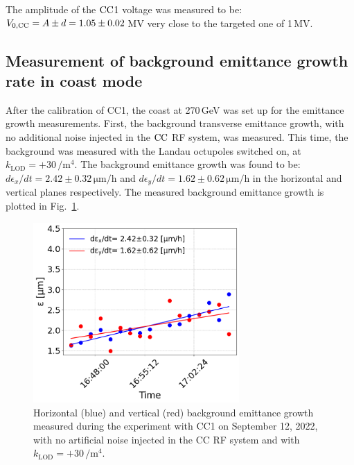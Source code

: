 The amplitude of the ${\mathrm{CC}}$1 voltage was measured to be: ${V_\mathrm{0, CC}}=A \pm d = 1.05 \pm 0.02$\,MV very close to the targeted one of 1\,MV.

\subsection{Measurement of background emittance growth rate in coast mode}
After the calibration of CC1, the coast at 270\,GeV was set up for the emittance growth measurements. First, the background transverse emittance growth, with no additional noise injected in the ${\mathrm{CC}}$ RF system, was measured. This time, the background was measured with the Landau octupoles switched on, at $k_\mathrm{LOD}=+30$\,$\mathrm{/m^4}$. The background emittance growth was found to be: $d\epsilon_x/dt=2.42 \pm 0.32$\,$\mathrm{\mu m/h}$ and $d\epsilon_y/dt=1.62 \pm 0.62$\,$\mathrm{\mu m/h}$ in the horizontal and vertical planes respectively. The measured background emittance growth is plotted in Fig.~\ref{fig:H_V_emit_growth_background_subtracted_octupole_scan_sep22}.


\begin{figure}[!h]
   \centering         
   \includegraphics[width=0.7\textwidth]{images/Ch8/cc_md_12sep22_backg_coast3.png}
       \caption{Horizontal (blue) and vertical (red) background emittance growth measured during the experiment with CC1 on September 12, 2022, with no artificial noise injected in the CC RF system and with $k_\mathrm{LOD}=+30$\,$\mathrm{/m^4}$.}
       \label{fig:H_V_emit_growth_background_subtracted_octupole_scan_sep22}
\end{figure}

